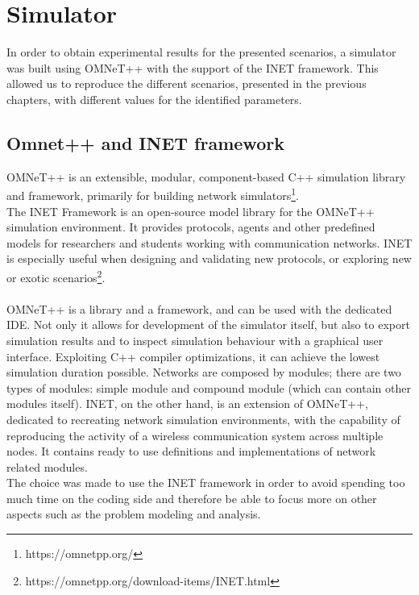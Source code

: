 %
\chapter{Simulator}\label{simulator}
In order to obtain experimental results for the presented scenarios, a simulator
was built using OMNeT++ with the support of the INET framework. This allowed us
to reproduce the different scenarios, presented in the previous chapters, with
different values for the identified parameters.\\
\section{Omnet++ and INET framework}
OMNeT++ is an extensible, modular, component-based C++ simulation library and
framework, primarily for building network simulators\footnote{https://omnetpp.org/}.\\
The INET Framework is an open-source model library for the OMNeT++ simulation
environment. It provides protocols, agents and other predefined models for
researchers and students working with communication networks. INET is especially
useful when designing and validating new protocols, or exploring new or exotic
scenarios\footnote{https://omnetpp.org/download-items/INET.html}.\\
\\
OMNeT++ is a library and a framework, and can be used with the dedicated IDE.
Not only it allows for development of the simulator itself, but also to export
simulation results and to inspect simulation behaviour with a graphical user
interface. Exploiting C++ compiler optimizations, it can achieve the lowest
simulation duration possible. Networks are composed by modules; there are two
types of modules: simple module and compound module (which can contain other
modules itself).
INET, on the other hand, is an extension of OMNeT++, dedicated to recreating 
network simulation environments, with the capability of reproducing the activity
of a wireless communication system across multiple nodes. It contains ready to
use definitions and implementations of network related modules.\\
The choice was made to use the INET framework in order to avoid spending too
much time on the coding side and therefore be able to focus more on other
aspects such as the problem modeling and analysis.
